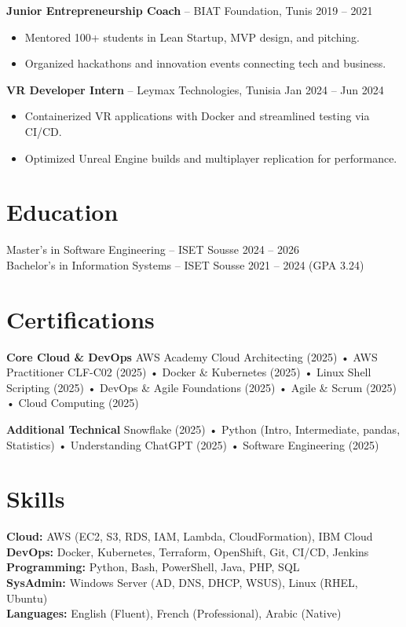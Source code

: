 \documentclass[a4paper,10pt]{article}
\begin{document}
\textbf{Junior Entrepreneurship Coach} – BIAT Foundation, Tunis \hfill 2019 -- 2021
\begin{itemize}
    \item Mentored 100+ students in Lean Startup, MVP design, and pitching.
    \item Organized hackathons and innovation events connecting tech and business.
\end{itemize}

\textbf{VR Developer Intern} – Leymax Technologies, Tunisia \hfill Jan 2024 -- Jun 2024
\begin{itemize}
    \item Containerized VR applications with Docker and streamlined testing via CI/CD.
    \item Optimized Unreal Engine builds and multiplayer replication for performance.
\end{itemize}

\section*{Education}
Master’s in Software Engineering – ISET Sousse \hfill 2024 -- 2026 \\
Bachelor’s in Information Systems – ISET Sousse \hfill 2021 -- 2024 (GPA 3.24)

\section*{Certifications}
\textbf{Core Cloud \& DevOps}  
AWS Academy Cloud Architecting (2025) • AWS Practitioner CLF-C02 (2025) • Docker \& Kubernetes (2025) • Linux Shell Scripting (2025) • DevOps \& Agile Foundations (2025) • Agile \& Scrum (2025) • Cloud Computing (2025)  

\textbf{Additional Technical}  
Snowflake (2025) • Python (Intro, Intermediate, pandas, Statistics) • Understanding ChatGPT (2025) • Software Engineering (2025)

\section*{Skills}
\textbf{Cloud:} AWS (EC2, S3, RDS, IAM, Lambda, CloudFormation), IBM Cloud \\
\textbf{DevOps:} Docker, Kubernetes, Terraform, OpenShift, Git, CI/CD, Jenkins \\
\textbf{Programming:} Python, Bash, PowerShell, Java, PHP, SQL \\
\textbf{SysAdmin:} Windows Server (AD, DNS, DHCP, WSUS), Linux (RHEL, Ubuntu) \\
\textbf{Languages:} English (Fluent), French (Professional), Arabic (Native)
\end{document}
